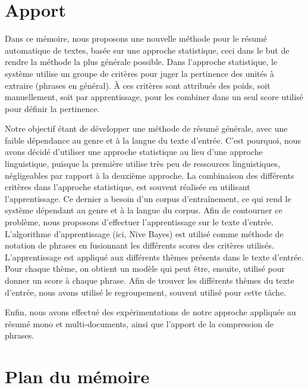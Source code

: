 \documentclass[a4paper,12pt,oneside]{../use/ESIthesis}
\begin{document}
\section*{Apport}

Dans ce mémoire, nous proposons une nouvelle méthode pour le résumé automatique de textes, basée sur une approche statistique, ceci dans le but de rendre la méthode la plus générale possible.
Dans l'approche statistique, le système utilise un groupe de critères pour juger la pertinence des unités à extraire (phrases en général). 
À ces critères sont attribués des poids, soit manuellement, soit par apprentissage, pour les combiner dans un seul score utilisé pour définir la pertinence.

Notre objectif étant de développer une méthode de résumé générale, avec une faible dépendance au genre et à la langue du texte d'entrée. 
C'est pourquoi, nous avons décidé d'utiliser une approche statistique au lieu d'une approche linguistique, puisque la première utilise très peu de ressources linguistiques, négligeables par rapport à la deuxième approche.
La combinaison des différents critères dans l'approche statistique, est souvent réalisée en utilisant l'apprentissage.
Ce dernier a besoin d'un corpus d'entraînement, ce qui rend le système dépendant au genre et à la langue du corpus.
Afin de contourner ce problème, nous proposons d'effectuer l'apprentissage sur le texte d'entrée.
L'algorithme d'apprentissage (ici, N\"ive Bayes) est utilisé comme méthode de notation de phrases en fusionnant les différents scores des critères utilisés.
L'apprentissage est appliqué aux différents thèmes présents dans le texte d'entrée.
Pour chaque thème, on obtient un modèle qui peut être, ensuite, utilisé pour donner un score à chaque phrase. 
Afin de trouver les différents thèmes du texte d'entrée, nous avons utilisé le regroupement, souvent utilisé pour cette tâche.

Enfin, nous avons effectué des expérimentations de notre approche appliquée au résumé mono et multi-documents, ainsi que l'apport de la compression de phrases. 

\section*{Plan du mémoire}
\end{document}
